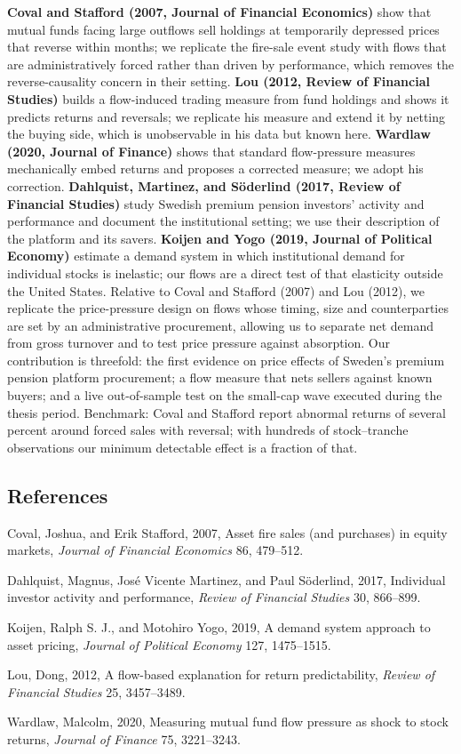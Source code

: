 \documentclass[12pt,a4paper]{article}
\newenvironment{refs}{\begin{list}{}{\setlength{\leftmargin}{1.5em}\setlength{\itemindent}{-1.5em}\setlength{\itemsep}{1pt}}}{\end{list}}
\begin{document}
\textbf{Coval and Stafford (2007, Journal of Financial Economics)} show that mutual funds facing large outflows sell holdings at temporarily depressed prices that reverse within months; we replicate the fire-sale event study with flows that are administratively forced rather than driven by performance, which removes the reverse-causality concern in their setting. \textbf{Lou (2012, Review of Financial Studies)} builds a flow-induced trading measure from fund holdings and shows it predicts returns and reversals; we replicate his measure and extend it by netting the buying side, which is unobservable in his data but known here. \textbf{Wardlaw (2020, Journal of Finance)} shows that standard flow-pressure measures mechanically embed returns and proposes a corrected measure; we adopt his correction. \textbf{Dahlquist, Martinez, and Söderlind (2017, Review of Financial Studies)} study Swedish premium pension investors' activity and performance and document the institutional setting; we use their description of the platform and its savers. \textbf{Koijen and Yogo (2019, Journal of Political Economy)} estimate a demand system in which institutional demand for individual stocks is inelastic; our flows are a direct test of that elasticity outside the United States. Relative to Coval and Stafford (2007) and Lou (2012), we replicate the price-pressure design on flows whose timing, size and counterparties are set by an administrative procurement, allowing us to separate net demand from gross turnover and to test price pressure against absorption. Our contribution is threefold: the first evidence on price effects of Sweden's premium pension platform procurement; a flow measure that nets sellers against known buyers; and a live out-of-sample test on the small-cap wave executed during the thesis period. Benchmark: Coval and Stafford report abnormal returns of several percent around forced sales with reversal; with hundreds of stock--tranche observations our minimum detectable effect is a fraction of that.

\subsection*{References}
\begin{refs}
\item Coval, Joshua, and Erik Stafford, 2007, Asset fire sales (and purchases) in equity markets, \emph{Journal of Financial Economics} 86, 479--512.
\item Dahlquist, Magnus, Jos\'e Vicente Martinez, and Paul S\"oderlind, 2017, Individual investor activity and performance, \emph{Review of Financial Studies} 30, 866--899.
\item Koijen, Ralph S. J., and Motohiro Yogo, 2019, A demand system approach to asset pricing, \emph{Journal of Political Economy} 127, 1475--1515.
\item Lou, Dong, 2012, A flow-based explanation for return predictability, \emph{Review of Financial Studies} 25, 3457--3489.
\item Wardlaw, Malcolm, 2020, Measuring mutual fund flow pressure as shock to stock returns, \emph{Journal of Finance} 75, 3221--3243.
\end{refs}
\end{document}
